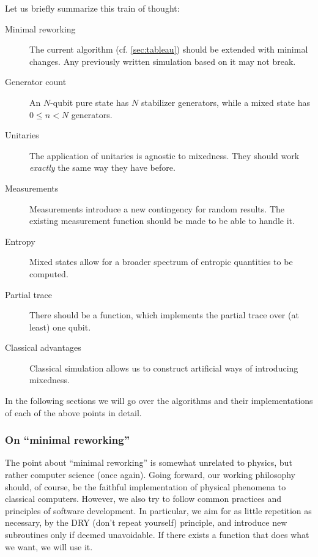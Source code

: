 Let us briefly summarize this train of thought:
\begin{description}
  \item[Minimal reworking] The current algorithm (cf. \cref{sec:tableau})
    should be extended with minimal changes. Any previously written simulation
    based on it may not break.
  \item[Generator count] An $N$-qubit pure state has $N$ stabilizer generators,
    while a mixed state has $0\leq n<N$ generators.
  \item[Unitaries] The application of unitaries is agnostic to mixedness. They
    should work \emph{exactly} the same way they have before.
  \item[Measurements] Measurements introduce a new contingency for random
    results. The existing measurement function should be made to be able to handle it.
  \item[Entropy] Mixed states allow for a broader spectrum of entropic
    quantities to be computed. %
  \item[Partial trace] There should be a function, which implements the partial trace over (at
    least) one qubit.
  \item[Classical advantages] Classical simulation allows us to construct artificial ways of
    introducing mixedness.
\end{description}
In the following sections we will go over the algorithms and their
implementations of each of the
above points in detail.

\subsubsection{On \enquote{minimal reworking}}
The point about \enquote{minimal reworking} is somewhat unrelated to
physics, but rather computer science (once again). Going forward, our working
philosophy should, of course, be the faithful implementation of physical
phenomena to classical computers. However, we also try to follow common
practices and principles of software development. In particular, we aim for as
little repetition as necessary, by the DRY (don't repeat yourself) principle,
and introduce new subroutines only if deemed unavoidable. If there exists a
function that does what we want, we will use it.

